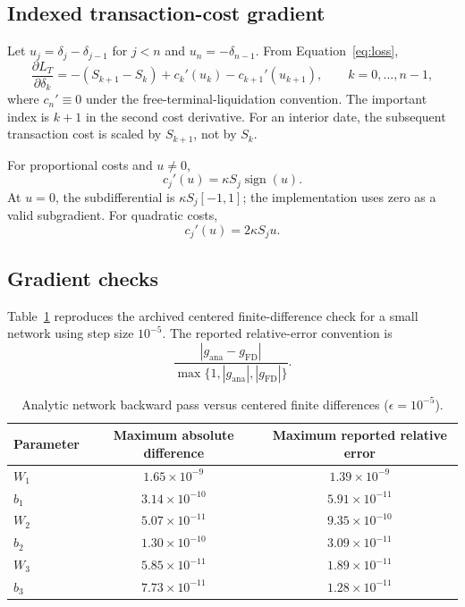 \subsection{Indexed transaction-cost gradient}

Let $u_j=\delta_j-\delta_{j-1}$ for $j<n$ and
$u_n=-\delta_{n-1}$. From Equation~\eqref{eq:loss},
\begin{equation}
  \frac{\partial L_T}{\partial\delta_k}
  =-(S_{k+1}-S_k)+c_k'(u_k)-c_{k+1}'(u_{k+1}),
  \qquad k=0,\ldots,n-1,
  \label{eq:delta_gradient_general}
\end{equation}
where $c_n'\equiv0$ under the free-terminal-liquidation convention. The
important index is $k+1$ in the second cost derivative. For an interior date,
the subsequent transaction cost is scaled by $S_{k+1}$, not by $S_k$.

For proportional costs and $u\neq0$,
\begin{equation}
  c_j'(u)=\kappa S_j\operatorname{sign}(u).
  \label{eq:linear_subgrad}
\end{equation}
At $u=0$, the subdifferential is
$\kappa S_j[-1,1]$; the implementation uses zero as a valid subgradient. For
quadratic costs,
\begin{equation}
  c_j'(u)=2\kappa S_j u.
  \label{eq:quadratic_grad}
\end{equation}

\subsection{Gradient checks}

Table~\ref{tab:gradcheck} reproduces the archived centered finite-difference
check for a small network using step size $10^{-5}$. The reported relative-error
convention is
\[
  \frac{|g_{\mathrm{ana}}-g_{\mathrm{FD}}|}
  {\max\{1,|g_{\mathrm{ana}}|,|g_{\mathrm{FD}}|\}}.
\]

\begin{table}[htbp]
\centering
\caption{Analytic network backward pass versus centered finite differences
($\epsilon=10^{-5}$).}
\label{tab:gradcheck}
\begin{tabular}{lcc}
\toprule
Parameter & Maximum absolute difference & Maximum reported relative error \\
\midrule
$W_1$ & $1.65\times10^{-9}$ & $1.39\times10^{-9}$ \\
$b_1$ & $3.14\times10^{-10}$ & $5.91\times10^{-11}$ \\
$W_2$ & $5.07\times10^{-11}$ & $9.35\times10^{-10}$ \\
$b_2$ & $1.30\times10^{-10}$ & $3.09\times10^{-11}$ \\
$W_3$ & $5.85\times10^{-11}$ & $1.89\times10^{-11}$ \\
$b_3$ & $7.73\times10^{-11}$ & $1.28\times10^{-11}$ \\
\bottomrule
\end{tabular}
\end{table}

